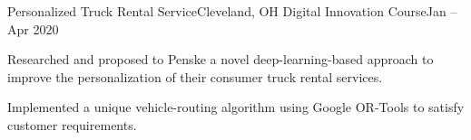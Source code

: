 \begin{ritemize}
{Personalized Truck Rental Service}{Cleveland, OH}
{Digital Innovation Course}{Jan -- Apr 2020}
	\item Researched and proposed to Penske a novel deep-learning-based approach to improve the personalization of their consumer truck rental services.
	\item Implemented a unique vehicle-routing algorithm using Google OR-Tools to satisfy customer requirements.
\end{ritemize}